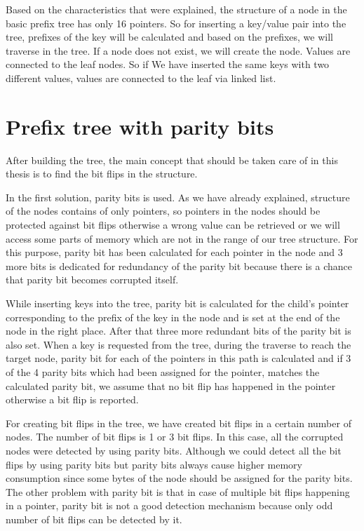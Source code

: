 \documentclass[12pt]{report}
\begin{document}
Based on the characteristics that were explained, the structure of a node in the basic prefix tree has only 16 pointers. So for inserting a key/value pair into the tree, prefixes of the key will be calculated and based on the prefixes, we will traverse in the tree. If a node does not exist, we will create the node. Values are connected to the leaf nodes. So if We have inserted the same keys with two different values, values are connected to the leaf via linked list.  
 
 
\section{ Prefix tree with parity bits}
 
After building the tree, the main concept that should be taken care of in this thesis is to find the bit flips in the structure.
 
In the first solution, parity bits is used. As we have already explained, structure of the nodes contains of only pointers, so pointers in the nodes should be protected against bit flips otherwise a wrong value can be retrieved or we will access some parts of memory which are not in the range of our tree structure. For this purpose, parity bit has been calculated for each pointer in the node and 3 more bits is dedicated for redundancy of the parity bit because there is a chance that parity bit becomes corrupted itself.

 While inserting keys into the tree, parity bit is calculated for the child's pointer corresponding to the prefix of the key in the node and is set at the end of the node in the right place. After that three more redundant bits of the parity bit is also set. When a key is requested from the tree, during the traverse to reach the target node, parity bit for each of the pointers in this path is calculated and if 3 of the 4 parity bits which had been assigned for the pointer, matches the calculated parity bit, we assume that no bit flip has happened in the pointer otherwise a bit flip is reported.

For creating bit flips in the tree, we have created bit flips in a certain number of nodes. The number of bit flips is 1 or 3 bit flips. In this case, all the corrupted nodes were detected by using parity bits.
Although we could detect all the bit flips by using parity bits but parity bits always cause higher memory consumption since some bytes of the node should be assigned for the parity bits. The other problem with parity bit is that in case of multiple bit flips happening in a pointer, parity bit is not a good detection mechanism because only odd number of bit flips can be detected by it.  
\end{document}

